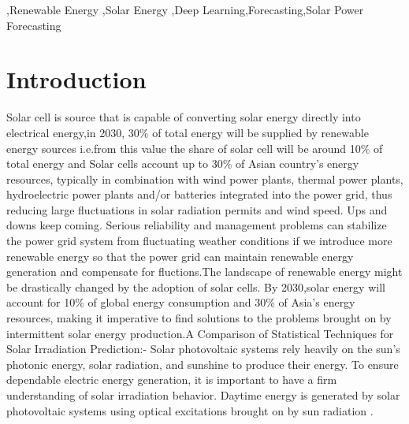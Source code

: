 \documentclass[a4paper,fleqn]{cas-sc}
\begin{document}


\begin{keywords}
  \sep Renewable Energy \sep Solar Energy \sep Deep Learning\sep Forecasting\sep Solar Power Forecasting
\end{keywords}

\maketitle

\section{Introduction}
Solar cell is source that is capable of converting solar energy directly into electrical energy,in 2030, 30\% of total energy will be supplied by renewable energy sources i.e.from this value the share of solar cell will be around 10\% of total energy and Solar cells account up to 30\% of Asian country’s energy resources, typically in combination with wind power plants, thermal power plants, hydroelectric power plants and/or batteries integrated into the power grid, thus reducing large fluctuations in solar radiation permits and wind speed. Ups and downs keep coming. Serious reliability and management problems can stabilize the power grid system from fluctuating weather conditions if we introduce more renewable energy so that the power grid can maintain renewable energy generation and compensate for fluctions.The landscape of renewable energy might be drastically changed by the adoption of solar cells. By 2030,solar energy will account for 10\% of global energy consumption and 30\% of Asia’s energy resources, making it imperative to find solutions to the problems brought on by intermittent solar energy production\cite{rai2022robust}.A Comparison of Statistical Techniques for Solar Irradiation Prediction:- Solar photovoltaic systems rely heavily on the sun’s photonic energy, solar radiation, and sunshine to produce their energy. To ensure dependable electric energy generation, it is important to have a firm understanding of solar irradiation behavior. Daytime energy is generated by solar photovoltaic systems using optical excitations brought on by sun radiation \cite{brahma2020solar}.
\end{document}
